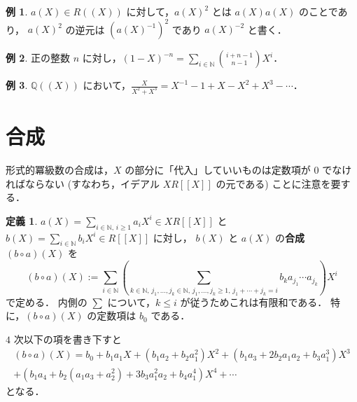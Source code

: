 \documentclass{jsarticle}
\newcommand{\N}{\mathbb{N}}
\newcommand{\Q}{\mathbb{Q}}
\theoremstyle{definition}
\newtheorem*{Dfn}{定義}
\newtheorem*{Exm}{例}
\newenvironment{dfn}{\vspace{1ex}\begin{screen}\begin{Dfn}}{\end{Dfn}\end{screen}\vspace{1ex}}
\newenvironment{exm}{\begin{leftbar}\begin{Exm}}{\end{Exm}\end{leftbar}}
\begin{document}
\begin{exm}
  $a(X) \in R((X))$ に対して，$a(X)^2$ とは $a(X) a(X)$ のことであり，
  $a(X)^2$ の逆元は $(a(X)^{-1})^2$ であり $a(X)^{-2}$ と書く．
\end{exm}

\begin{exm}
  正の整数 $n$ に対し，$(1 - X)^{-n} = \sum_{i\in\N} \binom{i+n-1}{n-1} X^i$．
\end{exm}

\begin{exm}
  $\Q((X))$ において，$\frac{X}{X^2 + X^3} = X^{-1} - 1 + X - X^2 + X^3 - \cdots$．
\end{exm}


\section{合成}
形式的冪級数の合成は，$X$ の部分に「代入」していいものは定数項が $0$ でなければならない (すなわち，イデアル $X R[[X]]$ の元である) ことに注意を要する．

\begin{dfn}
  $a(X) = \sum_{i\in\N,\,i\ge 1} a_i X^i \in X R[[X]]$ と
  $b(X) = \sum_{i\in\N} b_i X^i \in R[[X]]$ に対し，
  $b(X)$ と $a(X)$ の\textbf{合成} $(b \circ a)(X)$ を
  \[
    (b \circ a)(X) := \sum_{i\in\N} \left(\sum_{k\in\N,\, j_1,\ldots,j_k\in\N,\, j_1,\ldots,j_k\ge 1,\, j_1+\cdots+j_k=i} b_k a_{j_1} \cdots a_{j_k} \right) X^i
  \]
  で定める．
  内側の $\sum$ について，$k \le i$ が従うためこれは有限和である．
  特に，$(b \circ a)(X)$ の定数項は $b_0$ である．
\end{dfn}

$4$ 次以下の項を書き下すと
\begin{align*}
  (b \circ a)(X)
  = b_0
  + b_1 a_1 X
  + (b_1 a_2 + b_2 a_1^2) X^2
  + (b_1 a_3 + 2 b_2 a_1 a_2 + b_3 a_1^3) X^3 \\
  + (b_1 a_4 + b_2 (a_1 a_3 + a_2^2) + 3 b_3 a_1^2 a_2 + b_4 a_1^4) X^4
  + \cdots
\end{align*}
となる．
\end{document}
